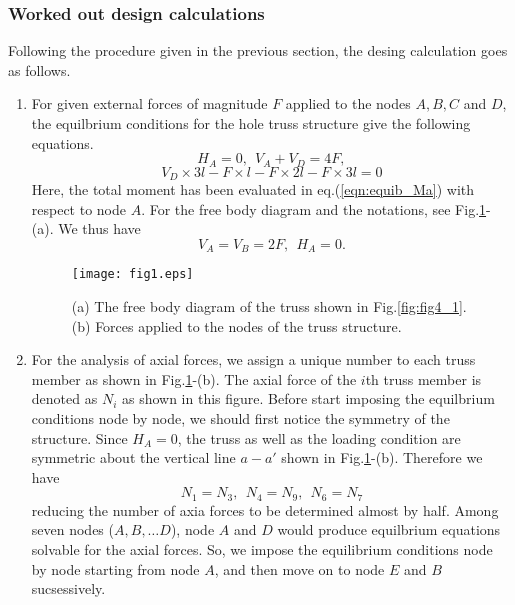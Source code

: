\documentclass[10pt,a4j]{article}
\begin{document}
\subsubsection{Worked out design calculations}
Following the procedure given in the previous section, the desing calculation goes as follows.  
\begin{enumerate}
\item
	For given external forces of magnitude $F$ applied to the nodes $A,B,C$ and $D$, 
	the equilbrium conditions for the hole truss structure give the following equations. 
	\begin{equation}
		H_A=0, \ \ V_A+V_D=4F, 
		\label{eqn:equib_fs}
	\end{equation}
	\begin{equation}
		V_D\times 3l - F\times l-F\times 2l-F\times 3l=0
		\label{eqn:equib_Ma}
	\end{equation}
	Here, the total moment has been evaluated in eq.(\ref{eqn:equib_Ma}) with respect to node $A$.
		For the free body diagram and the notations, see Fig.\ref{fig:fig1}-(a).
	We thus have 
	\begin{equation}
		V_A=V_B=2F, \ \ H_A=0.
		\label{eqn:reac_fs}
	\end{equation}
\begin{figure}[h]
	\begin{center}
	\texttt{[image: fig1.eps]} 
	\end{center}
	\caption{(a) The free body diagram of the truss shown in Fig.\ref{fig:fig4_1}. 
	(b) Forces applied to the nodes of the truss structure.} 
	\label{fig:fig1}
\end{figure}
\item
	For the analysis of axial forces, we assign a unique number to 
	each truss member as shown in Fig.\ref{fig:fig1}-(b).
	The axial force of the $i$th truss member is denoted as $N_i$ as shown in this figure.
	Before start imposing the equilbrium conditions node by node, we should 
	first notice the symmetry of the structure. 
	Since $H_A=0$, the truss as well as the loading condition are symmetric about the vertical 
	line $a-a'$ shown in Fig.\ref{fig:fig1}-(b). 
	Therefore we have 	
	\[
		N_1=N_3, \ \ N_4=N_9,\ \  N_6=N_7
	\]
	reducing the number of axia forces to be determined almost by half.
	Among seven nodes ($A,B,\dots D$), node $A$ and $D$ would produce 
	equilbrium equations solvable for the axial forces. So, we impose the 
	equilibrium conditions node by node starting from node $A$, 
	and then move on to node $E$ and $B$ sucsessively. 

\end{enumerate}
\end{document}
